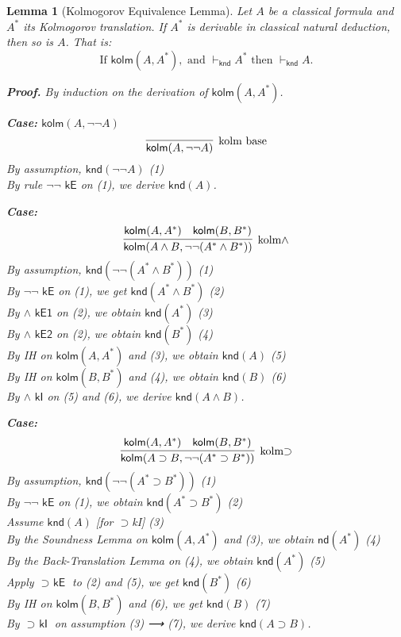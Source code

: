 \documentclass{article}
\newtheorem{lemma}{Lemma}
\begin{document}
  \begin{lemma}[Kolmogorov Equivalence Lemma]
    \label{lem:equiv}
    Let $A$ be a classical formula and $A^*$ its Kolmogorov translation. If $A^*$ is derivable in classical natural deduction, then so is $A$. That is:
    \[
    \text{If } \textsf{kolm}(A, A^*), \text{ and } \vdash_{\textsf{knd}} A^* \text{ then } \vdash_{\textsf{knd}} A.
    \]
    
    \textbf{Proof.}  
    By induction on the derivation of $\textsf{kolm}(A, A^*)$.
    
    \medskip

    \noindent \textbf{Case:} $\textsf{kolm}(A, \neg\neg A)$  
    \[
    \infer[\text{kolm base}]{\textsf{kolm}(A, \neg\neg A)}{}
    \]
    By assumption, $\textsf{knd}(\neg\neg A)$ \hfill (1)\\
    By rule $\textsf{$\neg\neg$ kE}$ on (1), we derive $\textsf{knd}(A)$.
    
    \medskip
    
    \noindent \textbf{Case:} 
    \[
    \infer[\text{kolm$\wedge$}]{\textsf{kolm}(A \wedge B, \neg\neg (A^* \wedge B^*))}{
      \textsf{kolm}(A, A^*) \quad \textsf{kolm}(B, B^*)
    }
    \]
    By assumption, $\textsf{knd}(\neg\neg (A^* \wedge B^*))$ \hfill (1)\\
    By $\textsf{$\neg\neg$ kE}$ on (1), we get $\textsf{knd}(A^* \wedge B^*)$ \hfill (2)\\
    By $\textsf{$\wedge$ kE1}$ on (2), we obtain $\textsf{knd}(A^*)$ \hfill (3)\\
    By $\textsf{$\wedge$ kE2}$ on (2), we obtain $\textsf{knd}(B^*)$ \hfill (4)\\
    By IH on $\textsf{kolm}(A, A^*)$ and (3), we obtain $\textsf{knd}(A)$ \hfill (5)\\
    By IH on $\textsf{kolm}(B, B^*)$ and (4), we obtain $\textsf{knd}(B)$ \hfill (6)\\
    By $\textsf{$\wedge$ kI}$ on (5) and (6), we derive $\textsf{knd}(A \wedge B)$.
    
    \medskip
    
    \noindent \textbf{Case:} 
    \[
    \infer[\text{kolm$\supset$}]{\textsf{kolm}(A \supset B, \neg\neg (A^* \supset B^*))}{
      \textsf{kolm}(A, A^*) \quad \textsf{kolm}(B, B^*)
    }
    \]
    By assumption, $\textsf{knd}(\neg\neg (A^* \supset B^*))$ \hfill (1)\\
    By $\textsf{$\neg\neg$ kE}$ on (1), we obtain $\textsf{knd}(A^* \supset B^*)$ \hfill (2)\\
    Assume $\textsf{knd}(A)$ [for $\supset$kI] \hfill (3)\\
    By the Soundness Lemma on $\textsf{kolm}(A, A^*)$ and (3), we obtain $\textsf{nd}(A^*)$ \hfill (4)\\
    By the Back-Translation Lemma on (4), we obtain $\textsf{knd}(A^*)$ \hfill (5)\\
    Apply $\textsf{$\supset$ kE}$ to (2) and (5), we get $\textsf{knd}(B^*)$ \hfill (6)\\
    By IH on $\textsf{kolm}(B, B^*)$ and (6), we get $\textsf{knd}(B)$ \hfill (7)\\
    By $\textsf{$\supset$ kI}$ on assumption (3) ⟶ (7), we derive $\textsf{knd}(A \supset B)$.
    

\end{lemma}
\end{document}
